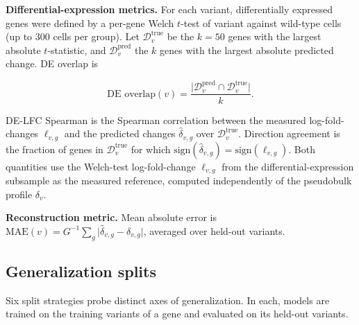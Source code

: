\documentclass[11pt,letterpaper]{article}
\begin{document}
\textbf{Differential-expression metrics.} For each variant, differentially expressed genes were defined by a per-gene Welch $t$-test of variant against wild-type cells (up to 300 cells per group). Let $\mathcal{D}^{\mathrm{true}}_v$ be the $k = 50$ genes with the largest absolute $t$-statistic, and $\mathcal{D}^{\mathrm{pred}}_v$ the $k$ genes with the largest absolute predicted change. DE overlap is

\[
\text{DE overlap}(v) = \frac{\lvert \mathcal{D}^{\mathrm{pred}}_v \cap \mathcal{D}^{\mathrm{true}}_v\rvert}{k}.
\]

DE-LFC Spearman is the Spearman correlation between the measured log-fold-changes $\ell_{v,g}$ and the predicted changes $\hat{\delta}_{v,g}$ over $\mathcal{D}^{\mathrm{true}}_v$. Direction agreement is the fraction of genes in $\mathcal{D}^{\mathrm{true}}_v$ for which $\mathrm{sign}(\hat{\delta}_{v,g}) = \mathrm{sign}(\ell_{v,g})$. Both quantities use the Welch-test log-fold-change $\ell_{v,g}$ from the differential-expression subsample as the measured reference, computed independently of the pseudobulk profile $\delta_v$.

\textbf{Reconstruction metric.} Mean absolute error is $\text{MAE}(v) = G^{-1}\sum_{g} \lvert \hat{\delta}_{v,g} - \delta_{v,g}\rvert$, averaged over held-out variants.

\subsection*{Generalization splits}

Six split strategies probe distinct axes of generalization. In each, models are trained on the training variants of a gene and evaluated on its held-out variants.
\end{document}

